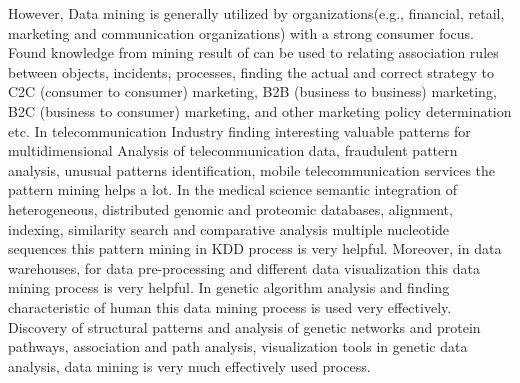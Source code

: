 However, Data mining is generally utilized by organizations(e.g., financial, retail, marketing and communication organizations) with a strong consumer focus. Found knowledge from mining result of can be used to relating association rules between objects, incidents, processes, finding the actual and correct strategy to C2C (consumer to consumer) marketing, B2B (business to business) marketing, B2C (business to consumer) marketing, and other marketing policy determination etc. In telecommunication Industry finding interesting valuable patterns for multidimensional Analysis of telecommunication data, fraudulent pattern analysis, unusual patterns identification, mobile telecommunication services the pattern mining helps a lot. In the medical science semantic integration of heterogeneous, distributed genomic and proteomic databases, alignment, indexing, similarity search and comparative analysis multiple nucleotide sequences this pattern mining in KDD process is very helpful. Moreover, in data warehouses, for data pre-processing and different data visualization this data mining process is very helpful. In genetic algorithm analysis and finding characteristic of human this data mining process is used very effectively. Discovery of structural patterns and analysis of genetic networks and protein pathways, association and path analysis, visualization tools in genetic data analysis, data mining is very much effectively used process.


